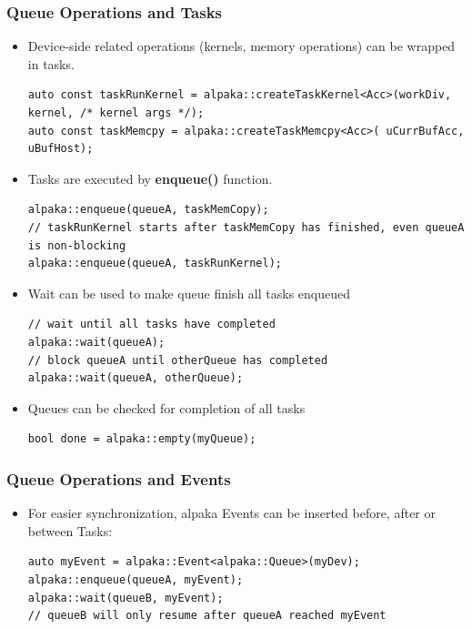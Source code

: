 \documentclass[9pt]{beamer}
\begin{document}
\begin{frame}[fragile]
\frametitle{Queue Operations and Tasks}
\begin{itemize}
\item Device-side related operations  (kernels, memory operations) can be wrapped in tasks.
\begin{lstlisting}
auto const taskRunKernel = alpaka::createTaskKernel<Acc>(workDiv, kernel, /* kernel args */);
auto const taskMemcpy = alpaka::createTaskMemcpy<Acc>( uCurrBufAcc, uBufHost);
\end{lstlisting}
\item Tasks are executed by \textbf{enqueue()} function.
\begin{lstlisting}
alpaka::enqueue(queueA, taskMemCopy);
// taskRunKernel starts after taskMemCopy has finished, even queueA is non-blocking
alpaka::enqueue(queueA, taskRunKernel);
\end{lstlisting}
\item Wait can be used to make queue finish all tasks enqueued
\begin{lstlisting}
// wait until all tasks have completed
alpaka::wait(queueA);
// block queueA until otherQueue has completed
alpaka::wait(queueA, otherQueue);
\end{lstlisting}
\item Queues can be checked for completion of all tasks
\begin{lstlisting}
bool done = alpaka::empty(myQueue);
\end{lstlisting}
\end{itemize}
\end{frame}

\begin{frame}[fragile]
\frametitle{Queue Operations and Events}

\begin{itemize}
\item For easier synchronization, alpaka Events can be inserted before, after or between Tasks:
\begin{lstlisting}
auto myEvent = alpaka::Event<alpaka::Queue>(myDev);
alpaka::enqueue(queueA, myEvent);
alpaka::wait(queueB, myEvent);
// queueB will only resume after queueA reached myEvent
\end{lstlisting}
\end{itemize}
\end{frame}
\end{document}

